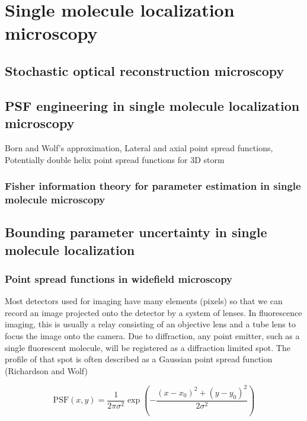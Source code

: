 \documentclass{ucetd}
\begin{document}
\clearpage

\mainmatter

\chapter{Single molecule localization microscopy}


\section{Stochastic optical reconstruction microscopy}

\section{PSF engineering in single molecule localization microscopy}

Born and Wolf's approximation, Lateral and axial point spread functions, Potentially double helix point spread functions for 3D storm

\subsection{Fisher information theory for parameter estimation in single molecule microscopy}

\section{Bounding parameter uncertainty in single molecule localization}

\subsection{Point spread functions in widefield microscopy}

Most detectors used for imaging have many elements (pixels) so that we can record an image projected onto the detector by a system of lenses. In fluorescence imaging, this is usually a relay consisting of an objective lens and a tube lens to focus the image onto the camera. Due to diffraction, any point emitter, such as a single fluorescent molecule, will be registered as a diffraction limited spot. The profile of that spot is often described as a Gaussian point spread function (Richardson and Wolf)

\begin{equation}
\mathrm{PSF}(x,y) = \frac{1}{2\pi\sigma^{2}}\exp\left(-\frac{(x-x_{0})^{2}+(y-y_{0})^{2}}{2\sigma^{2}}\right)
\end{equation}
\end{document}
